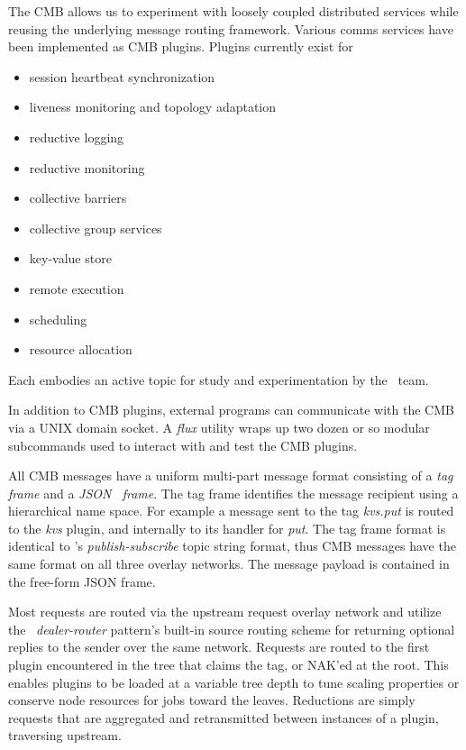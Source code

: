 The CMB allows us to experiment with loosely coupled distributed services
while reusing the underlying message routing framework.  Various comms
services have been implemented as CMB plugins.  Plugins currently exist for
\begin{itemize}
\item{session heartbeat synchronization}
\item{liveness monitoring and topology adaptation}
\item{reductive logging}
\item{reductive monitoring}
\item{collective barriers}
\item{collective group services}
\item{key-value store}
\item{remote execution}
\item{scheduling}
\item{resource allocation}
\end{itemize}
Each embodies an active topic for study and experimentation by the \flux\ team.

In addition to CMB plugins, external programs can communicate with the CMB
via a UNIX domain socket.  A {\em flux} utility wraps up two dozen or so
modular subcommands used to interact with and test the CMB plugins.

All CMB messages have a uniform multi-part message format consisting of
a {\em tag frame} and a {\em JSON~\cite{rfc4627} frame}.  The tag frame identifies the
message recipient using a hierarchical name space.  For example a message
sent to the tag {\em kvs.put} is routed to the {\em kvs} plugin, and internally
to its handler for {\em put}.  The tag frame format is identical to
\zMQ's {\em publish-subscribe} topic string format, thus CMB messages
have the same format on all three overlay networks.
The message payload is contained in the free-form JSON frame.

Most requests are routed via the upstream request overlay network
and utilize the \zMQ\ {\em dealer-router} pattern's built-in source routing
scheme for returning optional replies to the sender over the same network.
Requests are routed to the first plugin encountered in the tree that claims
the tag, or NAK'ed at the root.  This enables plugins to be loaded at
a variable tree depth to tune scaling properties or conserve node resources
for jobs toward the leaves.
Reductions are simply requests that are aggregated and retransmitted between
instances of a plugin, traversing upstream.

